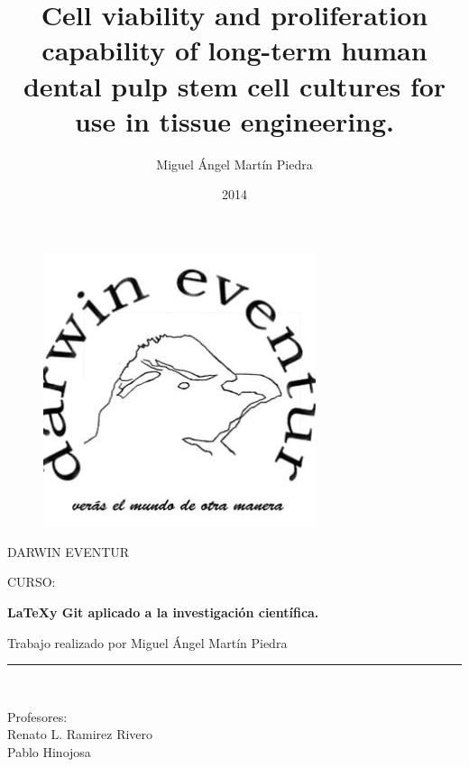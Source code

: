 \documentclass[a4paper,twocolumn,12pt]{article}
\author{Miguel Ángel Martín Piedra}
\title{Cell viability and proliferation capability of long-term human dental pulp stem cell cultures for use in tissue engineering.}
\date{2014}
\begin{document}
\begin{titlepage}

\begin{center}
\vspace*{-1in}
\begin{figure}[htb]
\begin{center}
\includegraphics[width=8cm]{logo}
\end{center}
\end{figure}

DARWIN EVENTUR\\
\vspace*{0.6in}
\begin{large}
CURSO:\\
\end{large}
\vspace*{0.2in}
\begin{Large}
\textbf{\LaTeX y Git aplicado a la investigación científica.} \\
\end{Large}
\vspace*{0.3in}
\begin{large}
Trabajo realizado por Miguel Ángel Martín Piedra\\
\end{large}
\vspace*{0.3in}
\rule{80mm}{0.1mm}\\
\vspace*{0.1in}
\begin{large}
Profesores: \\
Renato L. Ramirez Rivero \\
Pablo Hinojosa \\
\end{large}
\end{center}

\end{titlepage}
\end{document}
